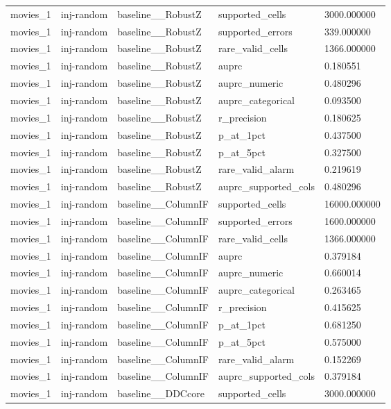 \begin{tabular}{lllll}
movies\_1 & inj-random & baseline\_\_RobustZ & supported\_cells & 3000.000000 \\
movies\_1 & inj-random & baseline\_\_RobustZ & supported\_errors & 339.000000 \\
movies\_1 & inj-random & baseline\_\_RobustZ & rare\_valid\_cells & 1366.000000 \\
movies\_1 & inj-random & baseline\_\_RobustZ & auprc & 0.180551 \\
movies\_1 & inj-random & baseline\_\_RobustZ & auprc\_numeric & 0.480296 \\
movies\_1 & inj-random & baseline\_\_RobustZ & auprc\_categorical & 0.093500 \\
movies\_1 & inj-random & baseline\_\_RobustZ & r\_precision & 0.180625 \\
movies\_1 & inj-random & baseline\_\_RobustZ & p\_at\_1pct & 0.437500 \\
movies\_1 & inj-random & baseline\_\_RobustZ & p\_at\_5pct & 0.327500 \\
movies\_1 & inj-random & baseline\_\_RobustZ & rare\_valid\_alarm & 0.219619 \\
movies\_1 & inj-random & baseline\_\_RobustZ & auprc\_supported\_cols & 0.480296 \\
movies\_1 & inj-random & baseline\_\_ColumnIF & supported\_cells & 16000.000000 \\
movies\_1 & inj-random & baseline\_\_ColumnIF & supported\_errors & 1600.000000 \\
movies\_1 & inj-random & baseline\_\_ColumnIF & rare\_valid\_cells & 1366.000000 \\
movies\_1 & inj-random & baseline\_\_ColumnIF & auprc & 0.379184 \\
movies\_1 & inj-random & baseline\_\_ColumnIF & auprc\_numeric & 0.660014 \\
movies\_1 & inj-random & baseline\_\_ColumnIF & auprc\_categorical & 0.263465 \\
movies\_1 & inj-random & baseline\_\_ColumnIF & r\_precision & 0.415625 \\
movies\_1 & inj-random & baseline\_\_ColumnIF & p\_at\_1pct & 0.681250 \\
movies\_1 & inj-random & baseline\_\_ColumnIF & p\_at\_5pct & 0.575000 \\
movies\_1 & inj-random & baseline\_\_ColumnIF & rare\_valid\_alarm & 0.152269 \\
movies\_1 & inj-random & baseline\_\_ColumnIF & auprc\_supported\_cols & 0.379184 \\
movies\_1 & inj-random & baseline\_\_DDCcore & supported\_cells & 3000.000000 \\

\end{tabular}
